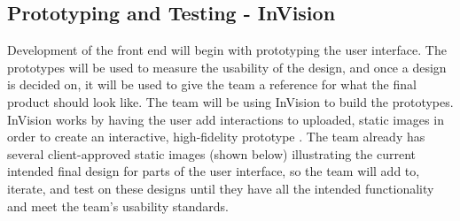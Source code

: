 \documentclass[draftclsnofoot, onecolumn, letterpaper,10pt,compsoc]{IEEEtran}
\begin{document}
\subsection{Prototyping and Testing - InVision}
Development of the front end will begin with prototyping the user interface. The prototypes will be used to measure the usability of the design, and once a design is decided on, it will be used to give the team a reference for what the final product should look like. The team will be using InVision to build the prototypes. InVision works by having the user add interactions to uploaded, static images in order to create an interactive, high-fidelity prototype \cite{invision}. The team already has several client-approved static images (shown below) illustrating the current intended final design for parts of the user interface, so the team will add to, iterate, and test on these designs until they have all the intended functionality and meet the team's usability standards. 
\end{document}
